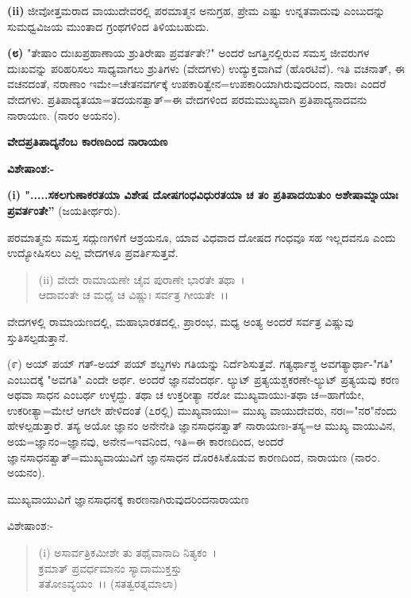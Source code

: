 \textbf{(ii)} ಜೀವೋತ್ತಮರಾದ ವಾಯುದೇವರಲ್ಲಿ ಪರಮಾತ್ಮನ ಅನುಗ್ರಹ, ಪ್ರೇಮ ಎಷ್ಟು ಉನ್ನತವಾದುವು ಎಂಬುದನ್ನು ಸುಮಧ್ವವಿಜಯ ಮುಂತಾದ ಗ್ರಂಥಗಳಿಂದ ತಿಳಿಯಬಹುದು.

\textbf{(೮)} "ತೇಷಾಂ ದುಃಖಪ್ರಹಾಣಾಯ ಶ್ರುತಿರೇಷಾ ಪ್ರವರ್ತತೇ?" ಅಂದರೆ ಜಗತ್ತಿನಲ್ಲಿರುವ ಸಮಸ್ತ ಜೀವರುಗಳ ದುಃಖವನ್ನು ಪರಿಹರಿಸಲು ಸಾಧ್ಯವಾಗಲು ಶ್ರುತಿಗಳು (ವೇದಗಳು) ಉದ್ಯುಕ್ತವಾಗಿವೆ (ಹೊರಟಿವೆ). ಇತಿ ವಚನಾತ್, ಈ ವಚನದಂತೆ, ನರಾಣಾಂ ಇಮೇ=ಚೇತನವರ್ಗಕ್ಕೆ ಉಪಕಾರಿತ್ವೇನ=ಉಪಕಾರಿಯಾಗಿರುವುದರಿಂದ, ನಾರಾಃ ಎಂದರೆ ವೇದಗಳು. ಪ್ರತಿಪಾದ್ಯತಯಾ=ತದಯನತ್ವಾತ್=ಈ ವೇದಗಳಿಂದ ಪರಮಮುಖ್ಯವಾಗಿ ಪ್ರತಿಪಾದ್ಯನಾದವನು ನಾರಾಯಣ. (ನಾರಂ ಅಯನಂ).

\begin{center}
\textbf{ವೇದಪ್ರತಿಪಾದ್ಯನೆಂಬ ಕಾರಣದಿಂದ ನಾರಾಯಣ}
\end{center}

\noindent
\textbf{ವಿಶೇಷಾಂಶ:-}

\textbf{(i) ".....ಸಕಲಗುಣಾಕರತಯಾ ವಿಶೇಷ ದೋಷಗಂಧವಿಧುರತಯಾ ಚ ತಂ ಪ್ರತಿಪಾದಯಿತುಂ ಅಶೇಷಾಮ್ನಾಯಾಃ ಪ್ರವರ್ತಂತೇ”} (ಜಯತೀರ್ಥರು).

ಪರಮಾತ್ಮನು ಸಮಸ್ತ ಸದ್ಗುಣಗಳಿಗೆ ಆಶ್ರಯನೂ, ಯಾವ ವಿಧವಾದ ದೋಷದ ಗಂಧವೂ ಸಹ ಇಲ್ಲದವನೂ ಎಂದು ಉದ್ಯೋಷಿಸಲು ಎಲ್ಲ ವೇದಗಳೂ ಪ್ರವರ್ತಿಸುತ್ತವೆ.

\begin{verse}
(ii) ವೇದೇ ರಾಮಾಯಣೇ ಚೈವ ಪುರಾಣೇ ಭಾರತೇ ತಥಾ~।\\ ಆದಾವಂತೇ ಚ ಮಧೈ ಚ ವಿಷ್ಣುಃ ಸರ್ವತ್ರ ಗೀಯತೇ~।।
\end{verse}


ವೇದಗಳಲ್ಲಿ ರಾಮಾಯಣದಲ್ಲಿ, ಮಹಾಭಾರತದಲ್ಲಿ, ಪ್ರಾರಂಭ, ಮಧ್ಯ ಅಂತ್ಯ ಅಂದರೆ ಸರ್ವತ್ರ ವಿಷ್ಣುವು ಸ್ತುತಿಸಲ್ಪಡುತ್ತಾನೆ.

(೯) ಅಯ್ ಪಯ್ ಗತ್‌-ಅಯ್ ಪಯ್ ಶಬ್ದಗಳು ಗತಿಯನ್ನು ನಿರ್ದೆಶಿಸುತ್ತವೆ. ಗತ್ಯರ್ಥಾಶ್ಚ ಅವಗತ್ಯಾರ್ಥಾ-"ಗತಿ" ಎಂಬುದಕ್ಕೆ "ಅವಗತಿ" ಎಂದೇ ಅರ್ಥ. ಅಂದರೆ ಜ್ಞಾನವೆಂದರ್ಥ. ಲ್ಯುಟ್ ಪ್ರತ್ಯಯಶ್ಚಕರಣೇ-ಲ್ಯುಟ್ ಪ್ರತ್ಯಯವು ಕರಣ ಅಥವಾ ಸಾಧನ ಎಂಬರ್ಥ ಉಳ್ಳದ್ದು. ತಥಾ ಚ ಉಕ್ತರೀತ್ಯಾ ನರೋ ಮುಖ್ಯವಾಯುಃ-ತಥಾ ಚ=ಹಾಗೆಯೇ, ಉಕರೀತ್ಯಾ=ಮೇಲೆ ಆಗಲೇ ಹೇಳಿದಂತೆ (೭ರಲ್ಲಿ) ಮುಖ್ಯವಾಯುಃ= ಮುಖ್ಯ ವಾಯುದೇವರು, ನರಃ="ನರ"ನೆಂದು ಹೇಳಲ್ಪಡುತ್ತಾರೆ. ತಸ್ಯ ಅಯೋ ಜ್ಞಾನಂ ಅನೇನೇತಿ ಜ್ಞಾನಸಾಧನತ್ವಾತ್ ನಾರಾಯಣಃ-ತಸ್ಯ=ಆ ಮುಖ್ಯ ವಾಯುವಿನ, ಅಯ=ಜ್ಞಾನಂ=ಜ್ಞಾನವು, ಅನೇನ=ಇವನಿಂದ, ಇತಿ=ಈ ಕಾರಣದಿಂದ, ಅಂದರೆ ಜ್ಞಾನಸಾಧನತ್ವಾತ್=ಮುಖ್ಯವಾಯುವಿಗೆ ಜ್ಞಾನಸಾಧನ ದೊರಕಿಸಿಕೊಡುವ ಕಾರಣದಿಂದ, ನಾರಾಯಣ (ನಾರ೦. ಅಯನಂ).

\begin{center}
ಮುಖ್ಯವಾಯುವಿಗೆ ಜ್ಞಾನಸಾಧನಕ್ಕೆ ಕಾರಣನಾಗಿರುವುದರಿಂದನಾರಾಯಣ
\end{center}

\noindent
ವಿಶೇಷಾಂಶ:-

\begin{verse}
(i) ಅಸಾರ್ವತ್ರಿಕಮೀಶೇ ತು ತಥೈವಾನಾದಿ ನಿತ್ಯಕಂ~।\\ ಕ್ರಮಾತ್ ಪ್ರವರ್ಧಮಾನಂ ಸ್ಯಾದಾಮುಕ್ತಸ್ತು\\ ತತೋಽವ್ಯಯಂ~।। (ಸತತ್ವರತ್ನಮಾಲಾ)
\end{verse}


